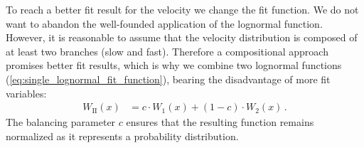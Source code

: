 To reach a better fit result for the velocity we change the fit function. We do not want to abandon the well-founded application of the lognormal function. However, it is reasonable to assume that the velocity distribution is composed of at least two branches (slow and fast). Therefore a compositional approach promises better fit results, which is why we combine two lognormal functions (\ref{eq:single_lognormal_fit_function}), bearing the disadvantage of more fit variables:
\begin{align}
	W_\text{II}(x) &= c \cdot W_1(x) + (1 -c) \cdot W_2(x)\,.	\label{eq:double_lognormal_fit_function}
\end{align}
The balancing parameter $c$ ensures that the resulting function remains normalized as it represents a probability distribution.

